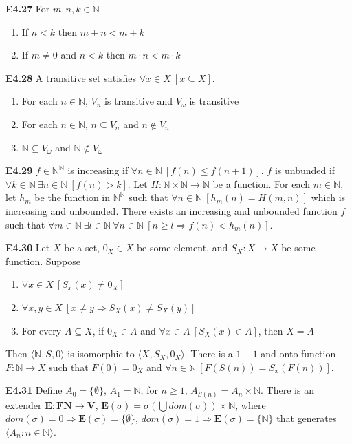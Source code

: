 \documentclass[10pt, landscape]{article}
\begin{document}
\begin{multicols*}{3}
\textbf{E4.27} For $m, n, k \in \mathbb{N}$
\begin{enumerate}
    \item If $n < k$ then $m+n<m+k$
    \item If $m \neq 0$ and $n<k$ then $m \cdot n < m \cdot k$
\end{enumerate}

\textbf{E4.28} A transitive set satisfies $\forall x \in X \ [x \subseteq X]$.
\begin{enumerate}
    \item For each $n \in \mathbb{N}$, $V_n$ is transitive and $V_\omega$ is transitive
    \item For each $n \in \mathbb{N}$, $n \subseteq V_n$ and $n \notin V_n$
    \item $\mathbb{N} \subseteq V_\omega$ and $\mathbb{N} \notin V_\omega$
\end{enumerate}

\textbf{E4.29} $f \in \mathbb{N}^\mathbb{N}$ is increasing if $\forall n \in \mathbb{N} \ [f(n) \leq f(n+1)]$. $f$ is unbunded if $\forall k \in \mathbb{N} \ \exists n \in \mathbb{N} \ [f(n)>k]$. Let $H:\mathbb{N} \times \mathbb{N} \rightarrow \mathbb{N}$ be a function. For each $m \in \mathbb{N}$, let $h_m$ be the function in $\mathbb{N}^\mathbb{N}$ such that $\forall n \in \mathbb{N} \ [h_m(n)=H(m, n)]$ which is increasing and unbounded. There exists an increasing and unbounded function $f$ such that $\forall m \in \mathbb{N} \ \exists l \in \mathbb{N} \ \forall n \in \mathbb{N} \ [n \geq l \Rightarrow f(n) < h_m(n)]$.

\textbf{E4.30} Let $X$ be a set, $0_X \in X$ be some element, and $S_X:X \rightarrow X$ be some function. Suppose
\begin{enumerate}
    \item $\forall x \in X \ [S_x(x)\neq 0_X]$
    \item $\forall x, y \in X \ [x \neq y \Rightarrow S_X(x) \neq S_X(y)]$
    \item For every $A \subseteq X$, if $0_X \in A$ and $\forall x \in A \ [S_X(x) \in A]$, then $X=A$
\end{enumerate}
Then $\langle \mathbb{N}, S, 0 \rangle$ is isomorphic to $\langle X, S_X, 0_X \rangle$. There is a $1-1$ and onto function $F: \mathbb{N} \rightarrow X$ such that $F(0)=0_X$ and $\forall n \in \mathbb{N}\ [F(S(n))=S_x(F(n))]$.

\textbf{E4.31} Define $A_0=\{\emptyset\}$, $A_1 = \mathbb{N}$, for $n\geq 1$, $A_{S(n)} = A_n \times \mathbb{N}$. There is an extender $\mathbf{E:FN\rightarrow V}$, $\mathbf{E}(\sigma)=\sigma(\bigcup dom(\sigma)) \times \mathbb{N}$, where $dom(\sigma)=0 \Rightarrow \mathbf{E}(\sigma)=\{\emptyset\}$, $dom(\sigma)=1 \Rightarrow \mathbf{E}(\sigma)=\{\mathbb{N}\}$ that generates $\langle A_n:n \in \mathbb{N}\rangle$.


\end{multicols*}
\end{document}

